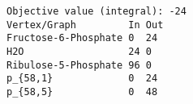 \begin{verbatim}
Objective value (integral): -24
Vertex/Graph         In Out 
Fructose-6-Phosphate 0  24  
H2O                  24 0   
Ribulose-5-Phosphate 96 0   
p_{58,1}             0  24  
p_{58,5}             0  48  
\end{verbatim}
